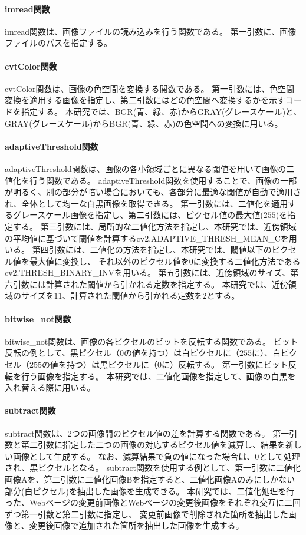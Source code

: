 \paragraph{imread関数}
imread関数は、画像ファイルの読み込みを行う関数である。
第一引数に、画像ファイルのパスを指定する。
\paragraph{cvtColor関数}
cvtColor関数は、画像の色空間を変換する関数である。
第一引数には、色空間変換を適用する画像を指定し、第二引数にはどの色空間へ変換するかを示すコードを指定する。
本研究では、BGR(青、緑、赤)からGRAY(グレースケール)と、GRAY(グレースケール)からBGR(青、緑、赤)の色空間への変換に用いる。
\paragraph{adaptiveThreshold関数}
adaptiveThreshold関数は、画像の各小領域ごとに異なる閾値を用いて画像の二値化を行う関数である。
adaptiveThreshold関数を使用することで、画像の一部が明るく、別の部分が暗い場合においても、各部分に最適な閾値が自動で適用され、全体として均一な白黒画像を取得できる。
第一引数には、二値化を適用するグレースケール画像を指定し、第二引数には、ピクセル値の最大値($255$)を指定する。
第三引数には、局所的な二値化方法を指定し、本研究では、近傍領域の平均値に基づいて閾値を計算するcv2.ADAPTIVE\_THRESH\_MEAN\_Cを用いる。
第四引数には、二値化の方法を指定し、本研究では、閾値以下のピクセル値を最大値に変換し、
それ以外のピクセル値を$0$に変換する二値化方法であるcv2.THRESH\_BINARY\_INVを用いる。
第五引数には、近傍領域のサイズ、第六引数には計算された閾値から引かれる定数を指定する。
本研究では、近傍領域のサイズを$11$、計算された閾値から引かれる定数を$2$とする。
\paragraph{bitwise\_not関数}
bitwise\_not関数は、画像の各ピクセルのビットを反転する関数である。
ビット反転の例として、黒ピクセル（$0$の値を持つ）は白ピクセルに（$255$に）、白ピクセル（$255$の値を持つ）は黒ピクセルに（$0$に）反転する。
第一引数にビット反転を行う画像を指定する。
本研究では、二値化画像を指定して、画像の白黒を入れ替える際に用いる。
\paragraph{subtract関数}
subtract関数は、2つの画像間のピクセル値の差を計算する関数である。
第一引数と第二引数に指定した二つの画像の対応するピクセル値を減算し、結果を新しい画像として生成する。
なお、減算結果で負の値になった場合は、$0$として処理され、黒ピクセルとなる。
subtract関数を使用する例として、第一引数に二値化画像Aを、第二引数に二値化画像Bを指定すると、二値化画像Aのみにしかない部分(白ピクセル)を抽出した画像を生成できる。
本研究では、二値化処理を行った、Webページの変更前画像とWebページの変更後画像をそれぞれ交互に二回ずつ第一引数と第二引数に指定し、
変更前画像で削除された箇所を抽出した画像と、変更後画像で追加された箇所を抽出した画像を生成する。

